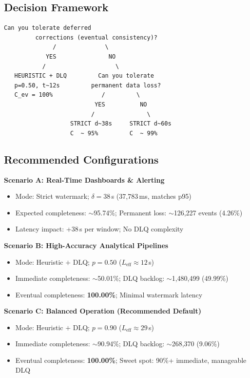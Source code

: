 \documentclass[11pt,a4paper]{article}
\newcommand{\Leff}{L_{\text{eff}}}
\begin{document}
\subsection{Decision Framework}

\begin{lstlisting}[caption={Deployment decision tree}, label={lst:decision}]
         Can you tolerate deferred
         corrections (eventual consistency)?
              /              \
            YES               NO
           /                    \
   HEURISTIC + DLQ         Can you tolerate
   p=0.50, t~12s         permanent data loss?
   C_ev = 100%              /         \
                          YES          NO
                         /               \
                   STRICT d~38s     STRICT d~60s
                   C  ~ 95%         C  ~ 99%
\end{lstlisting}

\subsection{Recommended Configurations}

\noindent\textbf{Scenario A: Real-Time Dashboards \& Alerting}
\begin{itemize}[leftmargin=*, itemsep=1pt]
  \item Mode: Strict watermark; $\delta = 38$\,s (37,783\,ms, matches p95)
  \item Expected completeness: $\sim$95.74\%; Permanent loss: $\sim$126,227 events (4.26\%)
  \item Latency impact: +38\,s per window; No DLQ complexity
\end{itemize}

\noindent\textbf{Scenario B: High-Accuracy Analytical Pipelines}
\begin{itemize}[leftmargin=*, itemsep=1pt]
  \item Mode: Heuristic $+$ DLQ; $p = 0.50$ ($\Leff \approx 12$\,s)
  \item Immediate completeness: $\sim$50.01\%; DLQ backlog: $\sim$1,480,499 (49.99\%)
  \item Eventual completeness: \textbf{100.00\%}; Minimal watermark latency
\end{itemize}

\noindent\textbf{Scenario C: Balanced Operation (Recommended Default)}
\begin{itemize}[leftmargin=*, itemsep=1pt]
  \item Mode: Heuristic $+$ DLQ; $p = 0.90$ ($\Leff \approx 29$\,s)
  \item Immediate completeness: $\sim$90.94\%; DLQ backlog: $\sim$268,370 (9.06\%)
  \item Eventual completeness: \textbf{100.00\%}; Sweet spot: 90\%+ immediate, manageable DLQ
\end{itemize}
\end{document}
